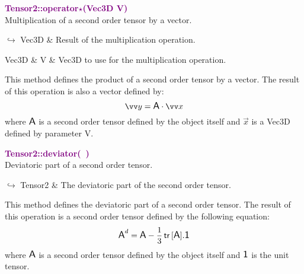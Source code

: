 \textcolor{purple}{\textbf{Tensor2::operator$\star$(Vec3D V)}}\label{Tensor2::operator*(Vec3D V)}\\
Multiplication of a second order tensor by a vector.\vspace*{-0.5em}
\begin{tcolorbox}[grow to left by=-1cm, width=\textwidth-1cm,myArgs,tabularx={l|R}]
$\hookrightarrow$ Vec3D & Result of the multiplication operation.
\end{tcolorbox}

\begin{tcolorbox}[width=\textwidth,myArgs,tabularx={ll|R}]
Vec3D & V & Vec3D to use for the multiplication operation.
\end{tcolorbox}

This method defines the product of a second order tensor by a vector.
The result of this operation is also a vector defined by:
\begin{equation*}
\overrightarrow{y} = \A \cdot \overrightarrow{x}
\end{equation*}
where $\mbox{\large\ensuremath{\mathsf{A}}}$ is a second order tensor defined by the object itself and $\overrightarrow{x}$ is a Vec3D defined by parameter V.

\textcolor{purple}{\textbf{Tensor2::deviator(~)}}\label{Tensor2::deviator()}\\
Deviatoric part of a second order tensor.\vspace*{-0.5em}
\begin{tcolorbox}[grow to left by=-1cm, width=\textwidth-1cm,myArgs,tabularx={l|R}]
$\hookrightarrow$ Tensor2 & The deviatoric part of the second order tensor.
\end{tcolorbox}

This method defines the deviatoric part of a second order tensor.
The result of this operation is a second order tensor defined by the following equation:
\begin{equation*}
\mbox{\large\ensuremath{\mathsf{A}}}^d=\mbox{\large\ensuremath{\mathsf{A}}}-\frac{1}{3}\mbox{\ensuremath{\mathsf{\,tr\,}}}[\mbox{\large\ensuremath{\mathsf{A}}}].\mbox{\large\ensuremath{\mathsf{1}}}
\end{equation*}
where $\mbox{\large\ensuremath{\mathsf{A}}}$ is a second order tensor defined by the object itself and $\mbox{\large\ensuremath{\mathsf{1}}}$ is the unit tensor.

